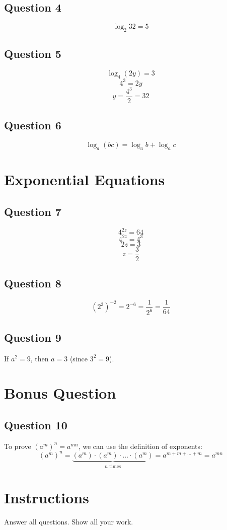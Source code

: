 \documentclass[12pt]{article}
\begin{document}
\subsection*{Question 4}
\[\log_2 32 = 5\]

\subsection*{Question 5}
\[\log_4 (2y) = 3\]
\[4^3 = 2y\]
\[y = \frac{4^3}{2} = 32\]

\subsection*{Question 6}
\[\log_a (bc) = \log_a b + \log_a c\]

\section*{Exponential Equations}

\subsection*{Question 7}
\[4^{2z} = 64\]
\[4^{2z} = 4^3\]
\[2z = 3\]
\[z = \frac{3}{2}\]

\subsection*{Question 8}
\[(2^3)^{-2} = 2^{-6} = \frac{1}{2^6} = \frac{1}{64}\]

\subsection*{Question 9}
If \(a^2 = 9\), then \(a = 3\) (since \(3^2 = 9\)).

\section*{Bonus Question}

\subsection*{Question 10}
To prove \((a^m)^n = a^{mn}\), we can use the definition of exponents:
\[(a^m)^n = \underbrace{(a^m) \cdot (a^m) \cdot \ldots \cdot (a^m)}_{n \text{ times}} = a^{m + m + \ldots + m} = a^{mn}\]
\newpage
\section*{Instructions}
Answer all questions. Show all your work.
\end{document}
